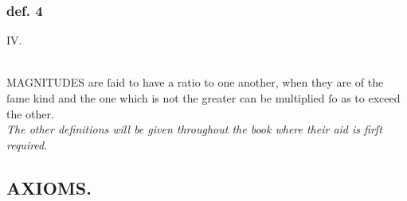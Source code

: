 \begin{center}
\begin{minipage}{0.8\textwidth}
    \subsubsection{def. 4}
    \begin{center}
      IV.\label{book5def4}\\
      \hfill\\
      \raggedright M\textsc{AGNITUDES} are ſaid to have a ratio to one another, when they are of the ſame kind and the one which is not the greater can be multiplied ſo as to exceed the other.
      \hfill\\
      \textit{The other definitions will be given throughout the book where their aid is firſt required}.
    \end{center}
  \end{minipage}
\end{center}

\newpage

\subsection[Axioms]{\centering \scshape{\LARGE{AXIOMS.}}}
\label{subsec:axioms}

